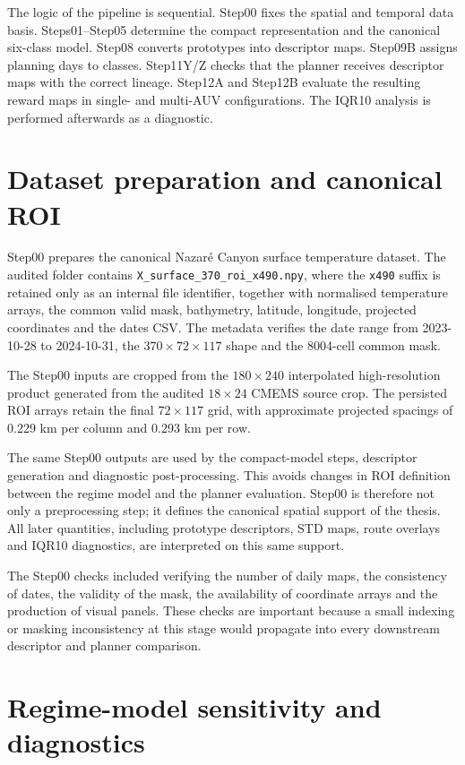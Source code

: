 The logic of the pipeline is sequential. Step00 fixes the spatial and temporal data basis. Steps01--Step05 determine the compact representation and the canonical six-class model. Step08 converts prototypes into descriptor maps. Step09B assigns planning days to classes. Step11Y/Z checks that the planner receives descriptor maps with the correct lineage. Step12A and Step12B evaluate the resulting reward maps in single- and multi-AUV configurations. The IQR10 analysis is performed afterwards as a diagnostic.

\section{Dataset preparation and canonical ROI}

Step00 prepares the canonical Nazar\'e Canyon surface temperature dataset. The audited folder contains \texttt{X\_surface\_370\_roi\_x490.npy}, where the \texttt{x490} suffix is retained only as an internal file identifier, together with normalised temperature arrays, the common valid mask, bathymetry, latitude, longitude, projected coordinates and the dates CSV. The metadata verifies the date range from 2023-10-28 to 2024-10-31, the $370 \times 72 \times 117$ shape and the 8004-cell common mask.

The Step00 inputs are cropped from the $180 \times 240$ interpolated high-resolution product generated from the audited $18 \times 24$ CMEMS source crop. The persisted ROI arrays retain the final $72 \times 117$ grid, with approximate projected spacings of 0.229 km per column and 0.293 km per row.

The same Step00 outputs are used by the compact-model steps, descriptor generation and diagnostic post-processing. This avoids changes in ROI definition between the regime model and the planner evaluation. Step00 is therefore not only a preprocessing step; it defines the canonical spatial support of the thesis. All later quantities, including prototype descriptors, STD maps, route overlays and IQR10 diagnostics, are interpreted on this same support.

The Step00 checks included verifying the number of daily maps, the consistency of dates, the validity of the mask, the availability of coordinate arrays and the production of visual panels. These checks are important because a small indexing or masking inconsistency at this stage would propagate into every downstream descriptor and planner comparison.

\section{Regime-model sensitivity and diagnostics}

